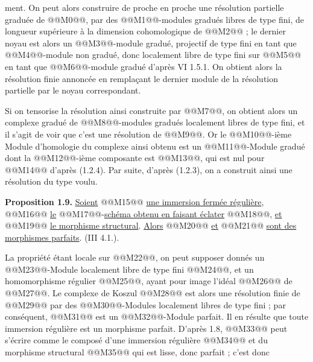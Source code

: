 
ment. On peut alors construire de proche en proche une résolution partielle graduée de @@M0@@, par des @@M1@@-modules gradués libres de type fini, de longueur supérieure à la dimension cohomologique de @@M2@@ ; le dernier noyau est alors un @@M3@@-module gradué, projectif de type fini en tant que @@M4@@-module non gradué, donc localement libre de type fini sur @@M5@@ en tant que @@M6@@-module gradué d'après VI 1.5.1. On obtient alors la résolution finie annoncée en remplaçant le dernier module de la résolution partielle par le noyau correspondant.

Si on tensorise la résolution ainsi construite par @@M7@@, on obtient alors un complexe gradué de @@M8@@-modules gradués localement libres de type fini, et il s'agit de voir que c'est une résolution de @@M9@@. Or le @@M10@@-ième Module d'homologie du complexe ainsi obtenu est un @@M11@@-Module gradué dont la @@M12@@-ième composante est @@M13@@, qui est nul pour @@M14@@ d'après (1.2.4). Par suite, d'après (1.2.3), on a construit ainsi une résolution du type voulu.

\textbf{Proposition 1.9.} \uline{Soient} @@M15@@ \uline{une immersion fermée régulière}, @@M16@@ \uline{le} @@M17@@-\uline{schéma obtenu en faisant éclater} @@M18@@, \uline{et} @@M19@@ \uline{le morphisme structural}. \uline{Alors} @@M20@@ \uline{et} @@M21@@ \uline{sont des morphismes parfaits}. (III 4.1.).

La propriété étant locale sur @@M22@@, on peut supposer donnés un @@M23@@-Module localement libre de type fini @@M24@@, et un homomorphisme régulier @@M25@@, ayant pour image l'idéal @@M26@@ de @@M27@@. Le complexe de Koszul @@M28@@ est alors une résolution finie de @@M29@@ par des @@M30@@-Modules localement libres de type fini ; par conséquent, @@M31@@ est un @@M32@@-Module parfait. Il en résulte que toute immersion régulière est un morphisme parfait. D'après 1.8, @@M33@@ peut s'écrire comme le composé d'une immersion régulière @@M34@@ et du morphisme structural @@M35@@ qui est lisse, donc parfait ; c'est donc
